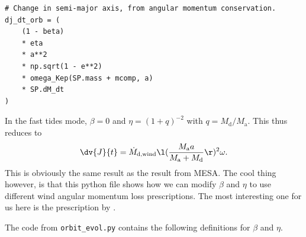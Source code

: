 \documentclass[a4paper,10pt]{article}
\begin{document}
\begin{verbatim}
# Change in semi-major axis, from angular momentum conservation.
dj_dt_orb = (
    (1 - beta)
    * eta
    * a**2
    * np.sqrt(1 - e**2)
    * omega_Kep(SP.mass + mcomp, a)
    * SP.dM_dt
)
\end{verbatim}
In the fast tides mode, \(\beta = 0\) and \(\eta = (1 +q)^{-2} \) with \(q = M_\text{d} / M_\text{a}\). This thus reduces to
\begin{align*}
    \dv{J}{t} = \dot{M}_\text{d,wind} \l(\frac{M_\text{a}a}{M_\text{a} +M_\text{d}}\r)^{2} \omega.
\end{align*}
This is obviously the same result as the result from MESA. The cool thing however, is that this python file shows how we can modify \(\beta \) and \(\eta \) to use different wind angular momentum loss prescriptions. The most interesting one for us here is the prescription by \citet{saladino2019}.

The code from \lstinline[style=output, breaklines=true]|orbit_evol.py| contains the following definitions for \(\beta \) and \(\eta \).
\end{document}
